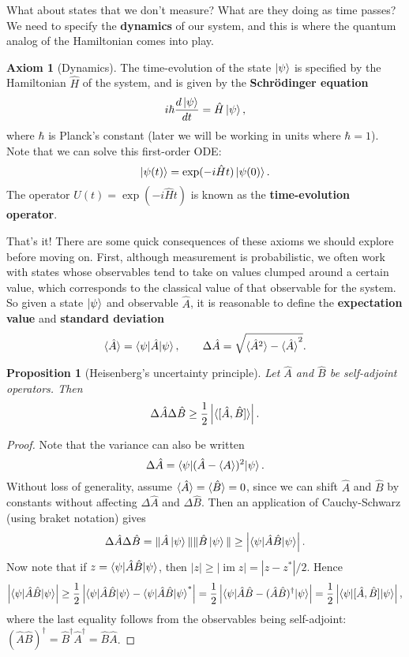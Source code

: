 \documentclass{report}
\theoremstyle{plain}
\newtheorem{proposition}[theorem]{Proposition}
\theoremstyle{definition}
\newtheorem{axiom}{Axiom}
\theoremstyle{remark}
\DeclareMathOperator{\im}{im}
\begin{document}
What about states that we don't measure? What are they doing as time
passes? We need to specify the {\bf dynamics} of our system, and this
is where the quantum analog of the Hamiltonian comes into play.

\begin{axiom}[Dynamics]
  The time-evolution of the state $\ket{\psi}$ is specified by the
  Hamiltonian $\hat{H}$ of the system, and is given by the {\bf
    Schr\"odinger equation}
  $$ i\hbar \frac{d\ket{\psi}}{dt} = \hat{H}\ket{\psi}, $$
  where $\hbar$ is Planck's constant (later we will be working in
  units where $\hbar = 1$). Note that we can solve this first-order ODE:
  $$ \ket{\psi(t)} = \exp(-i\hat{H}t)\ket{\psi(0)}. $$
  The operator $U(t) = \exp(-i\hat{H}t)$ is known as the {\bf
    time-evolution operator}.
\end{axiom}

That's it! There are some quick consequences of these axioms we should
explore before moving on. First, although measurement is
probabilistic, we often work with states whose observables tend to
take on values clumped around a certain value, which corresponds to
the classical value of that observable for the system. So given a
state $\ket{\psi}$ and observable $\hat{A}$, it is reasonable to
define the {\bf expectation value} and {\bf standard deviation}
$$ \braket{\hat{A}} = \braket{\psi|\hat{A}|\psi}, \qquad \Delta \hat{A} = \sqrt{\braket{\hat{A}^2} - \braket{\hat{A}}^2}. $$

\begin{proposition}[Heisenberg's uncertainty principle]
  Let $\hat{A}$ and $\hat{B}$ be self-adjoint operators. Then
  $$ \Delta \hat{A} \Delta \hat{B} \ge \frac{1}{2}\left|\braket{[\hat{A}, \hat{B}]}\right|. $$
\end{proposition}

\begin{proof}
  Note that the variance can also be written 
  $$ \Delta \hat{A} = \braket{\psi|(\hat{A} - \braket{A})^2|\psi}. $$
  Without loss of generality, assume
  $\braket{\hat{A}} = \braket{\hat{B}} = 0$, since we can shift
  $\hat{A}$ and $\hat{B}$ by constants without affecting
  $\Delta \hat{A}$ and $\Delta \hat{B}$. Then an application of
  Cauchy-Schwarz (using braket notation) gives
  $$ \Delta \hat{A} \Delta \hat{B} = \|\hat{A}\ket{\psi}\| \|\hat{B}\ket{\psi}\| \ge \left|\braket{\psi|\hat{A}\hat{B}|\psi}\right|. $$
  Now note that if $z = \braket{\psi|\hat{A}\hat{B}|\psi}$, then
  $|z| \ge |\im z| = |z - z^*|/2$. Hence
  $$ \left|\braket{\psi|\hat{A}\hat{B}|\psi}\right| \ge \frac{1}{2}\left|\braket{\psi|\hat{A}\hat{B}|\psi} - \braket{\psi|\hat{A}\hat{B}|\psi}^*\right| = \frac{1}{2}\left|\braket{\psi|\hat{A}\hat{B} - (\hat{A}\hat{B})^\dagger|\psi}\right| = \frac{1}{2}\left|\braket{\psi|[\hat{A}, \hat{B}]|\psi}\right|, $$
  where the last equality follows from the observables being
  self-adjoint:
  $(\hat{A}\hat{B})^\dagger = \hat{B}^\dagger\hat{A}^\dagger =
  \hat{B}\hat{A}$.
\end{proof}
\end{document}
